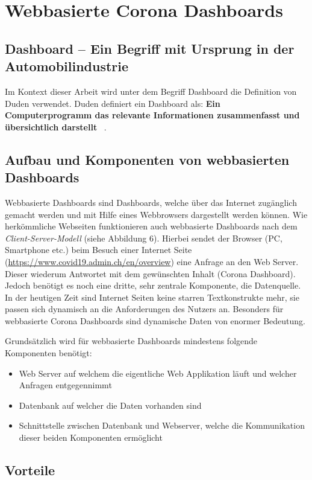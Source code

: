 \section{Webbasierte Corona Dashboards}

\subsection{Dashboard – Ein Begriff mit Ursprung in der Automobilindustrie}
Im Kontext dieser Arbeit wird unter dem Begriff Dashboard die Definition von Duden verwendet. Duden definiert ein Dashboard als: \textbf{Ein Computerprogramm das relevante Informationen zusammenfasst und übersichtlich darstellt} ~\citep{term_definition_dashboard}.


\subsection{Aufbau und Komponenten von webbasierten Dashboards}
Webbasierte Dashboards sind Dashboards, welche über das Internet zugänglich gemacht werden und mit Hilfe eines Webbrowsers dargestellt werden können. Wie herkömmliche Webseiten funktionieren auch webbasierte Dashboards nach dem \textit{Client-Server-Modell} (siehe Abbildung 6). Hierbei sendet der Browser (PC, Smartphone etc.) beim Besuch einer Internet Seite (\url{https://www.covid19.admin.ch/en/overview}) eine Anfrage an den Web Server. Dieser wiederum Antwortet mit dem gewünschten Inhalt (Corona Dashboard). Jedoch benötigt es noch eine dritte, sehr zentrale Komponente, die Datenquelle. In der heutigen Zeit sind Internet Seiten keine starren Textkonstrukte mehr, sie passen sich dynamisch an die Anforderungen des Nutzers an. Besonders für webbasierte Corona Dashboards sind dynamische Daten von enormer Bedeutung. 

Grundsätzlich wird für webbasierte Dashboards mindestens folgende Komponenten benötigt:
\begin{itemize}
    \item Web Server auf welchem die eigentliche Web Applikation läuft und welcher Anfragen entgegennimmt
    \item Datenbank auf welcher die Daten vorhanden sind
    \item Schnittstelle zwischen Datenbank und Webserver, welche die Kommunikation dieser beiden Komponenten ermöglicht
\end{itemize}

\subsection{Vorteile}

